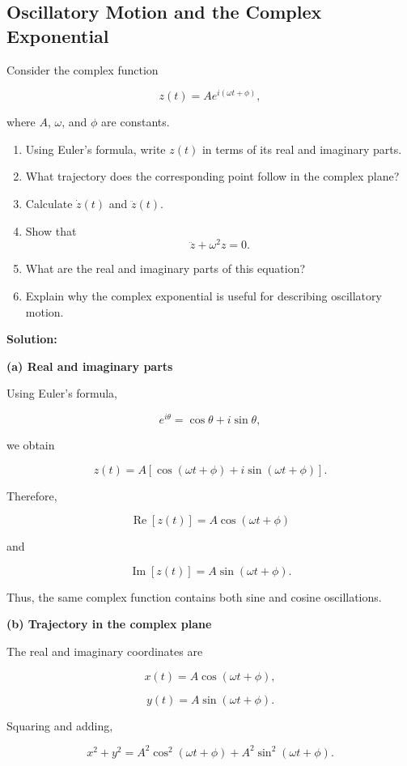 \documentclass[12pt]{article}
\theoremstyle{remark}
\begin{document}
\subsection{Oscillatory Motion and the Complex Exponential}

Consider the complex function

\[
z(t)=Ae^{i(\omega t+\phi)},
\]

where \(A\), \(\omega\), and \(\phi\) are constants.

\begin{enumerate}
    \item Using Euler's formula, write \(z(t)\) in terms of its real and imaginary parts.
    \item What trajectory does the corresponding point follow in the complex plane?
    \item Calculate \(\dot z(t)\) and \(\ddot z(t)\).
    \item Show that
    \[
    \ddot z+\omega^2 z=0.
    \]
    \item What are the real and imaginary parts of this equation?
    \item Explain why the complex exponential is useful for describing oscillatory motion.
\end{enumerate}

\textbf{Solution:}

\textbf{(a) Real and imaginary parts}

Using Euler's formula,

\[
e^{i\theta}
=
\cos\theta+i\sin\theta,
\]

we obtain

\[
z(t)
=
A\left[
\cos(\omega t+\phi)
+
i\sin(\omega t+\phi)
\right].
\]

Therefore,

\[
\boxed{
\operatorname{Re}[z(t)]
=
A\cos(\omega t+\phi)
}
\]

and

\[
\boxed{
\operatorname{Im}[z(t)]
=
A\sin(\omega t+\phi).
}
\]

Thus, the same complex function contains both sine and cosine oscillations.

\textbf{(b) Trajectory in the complex plane}

The real and imaginary coordinates are

\[
x(t)=A\cos(\omega t+\phi),
\]

\[
y(t)=A\sin(\omega t+\phi).
\]

Squaring and adding,

\[
x^2+y^2
=
A^2\cos^2(\omega t+\phi)
+
A^2\sin^2(\omega t+\phi).
\]
\end{document}

